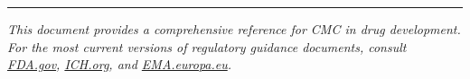 \documentclass[
  11pt,
  a4paper,
]{report}
\begin{document}
\begin{center}\rule{0.5\linewidth}{0.5pt}\end{center}

\emph{This document provides a comprehensive reference for CMC in drug
development. For the most current versions of regulatory guidance
documents, consult \href{https://www.fda.gov}{FDA.gov},
\href{https://www.ich.org}{ICH.org}, and
\href{https://www.ema.europa.eu}{EMA.europa.eu}.}
\end{document}
